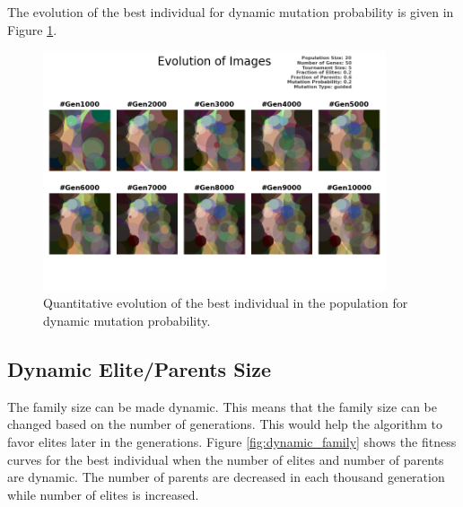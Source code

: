 \documentclass{assignment}
\begin{document}
The evolution of the best individual for dynamic mutation probability is given in Figure \ref{fig:dynamic_mutation_image}.

\begin{figure}[!htb]
    \centering
    \includegraphics[width=0.9\textwidth]{figures/images_outputPROB_20_50_5_0.2_0.6_0.2_guided.png}
    \caption{Quantitative evolution of the best individual in the population for dynamic mutation probability.}
    \label{fig:dynamic_mutation_image}
\end{figure}


\subsection{Dynamic Elite/Parents Size}

The family size can be made dynamic. This means that the family size can be changed based on the number of generations. This would help the algorithm to favor elites later in the generations. Figure \ref{fig:dynamic_family} shows the fitness curves for the best individual when the number of elites and number of parents are dynamic. The number of parents are decreased in each thousand generation while number of elites is increased.
\end{document}
